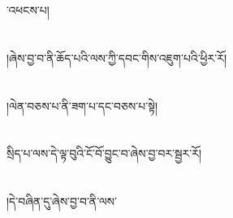་འཕངས་པ།\chapter{ }།ཞེས་བྱ་བ་ནི་ཆོད་པའི་ལས་ཀྱི་དབང་གིས་འཇུག་པའི་ཕྱིར་རོ།\chapter{ }།ལེན་བཅས་པ་ནི་ཟག་པ་དང་བཅས་པ་སྟེ།\chapter{ }སྲིད་པ་ལས་དེ་ལྟ་བུའི་ངོ་བོ་བྱུང་བ་ཞེས་བྱ་བར་སྦྱར་རོ།\chapter{ }།དེ་བཞིན་དུ་ཞེས་བྱ་བ་ནི་ལས་